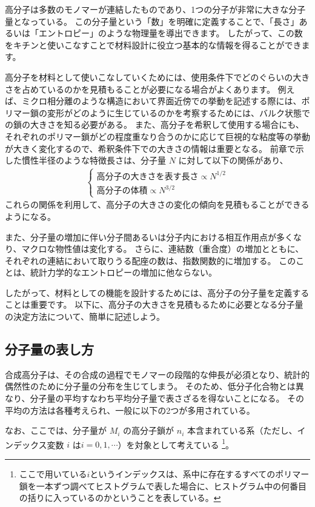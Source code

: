 \documentclass[a4paper,11pt]{ltjsarticle}
\begin{document}
高分子は多数のモノマーが連結したものであり、1つの分子が非常に大きな分子量となっている。
この分子量という「数」を明確に定義することで、「長さ」あるいは「エントロピー」のような物理量を導出できます。
したがって、この数をキチンと使いこなすことで材料設計に役立つ基本的な情報を得ることができます。

高分子を材料として使いこなしていくためには、使用条件下でどのぐらいの大きさを占めているのかを見積もることが必要になる場合がよくあります。
例えば、ミクロ相分離のような構造において界面近傍での挙動を記述する際には、ポリマー鎖の変形がどのように生じているのかを考察するためには、バルク状態での鎖の大きさを知る必要がある。
また、高分子を希釈して使用する場合にも、それぞれのポリマー鎖がどの程度重なり合うのかに応じて巨視的な粘度等の挙動が大きく変化するので、希釈条件下での大きさの情報は重要となる。
前章で示した慣性半径のような特徴長さは、分子量 $N$ に対して以下の関係があり、
\begin{align*}
\begin{cases}
\text{高分子の大きさを表す長さ} \propto N^{1/2} \\[8pt]
\text{高分子の体積} \propto N^{3/2}
\end{cases}
\end{align*}
これらの関係を利用して、高分子の大きさの変化の傾向を見積もることができるようになる。

また、分子量の増加に伴い分子間あるいは分子内における相互作用点が多くなり、マクロな物性値は変化する。
さらに、連結数（重合度）の増加とともに、それぞれの連結において取りうる配座の数は、指数関数的に増加する。
このことは、統計力学的なエントロピーの増加に他ならない。

したがって、材料としての機能を設計するためには、高分子の分子量を定義することは重要です。
以下に、高分子の大きさを見積もるために必要となる分子量の決定方法について、簡単に記述しよう。


\subsection{分子量の表し方}
合成高分子は、その合成の過程でモノマーの段階的な伸長が必須となり、統計的偶然性のために分子量の分布を生じてしまう。
そのため、低分子化合物とは異なり、分子量の平均すなわち平均分子量で表さざるを得ないことになる。
その平均の方法は各種考えられ、一般に以下の2つが多用されている。

なお、ここでは、分子量が $M_i$ の高分子鎖が $n_i$ 本含まれている系（ただし、インデックス変数 $i$ は$i=0,1,\cdots$）を対象として考えている
\footnote
{
ここで用いている$i$というインデックスは、系中に存在するすべてのポリマー鎖を一本ずつ調べてヒストグラムで表した場合に、ヒストグラム中の何番目の括りに入っているのかということを表している。
}。
\end{document}
